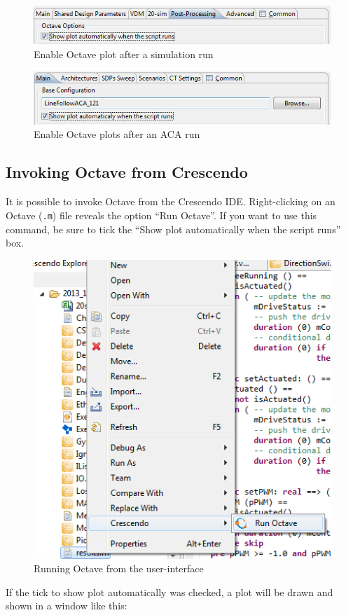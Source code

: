 \documentclass{crescendorepchap}
\begin{document}
\begin{figure}[htbp]
\centering
\includegraphics[width=.6\textwidth]{images/TickOctaveplotNormal.png}
\caption{Enable Octave plot after a simulation run}
\label{singleoctave}
\end{figure}

\begin{figure}[htbp]
\centering
\includegraphics[width=.6\textwidth]{images/TickOctavePlotACA.png}
\caption{Enable Octave plots after an ACA run}
\label{multioctave}
\end{figure}

\subsection{Invoking Octave from Crescendo}

It is possible to invoke Octave from the Crescendo IDE. Right-clicking on
an Octave (\texttt{.m}) file reveals the option ``Run Octave''. If you want to
use this command, be sure to tick the ``Show plot automatically when the
script runs'' box.

\begin{figure}[htbp]
\centering
\includegraphics[width=.6\textwidth]{images/OctaveAction.png}
\caption{Running Octave from the user-interface}
\end{figure}

\noindent If the tick to show plot automatically was checked, a plot will be drawn
and shown in a window like this:
\end{document}
